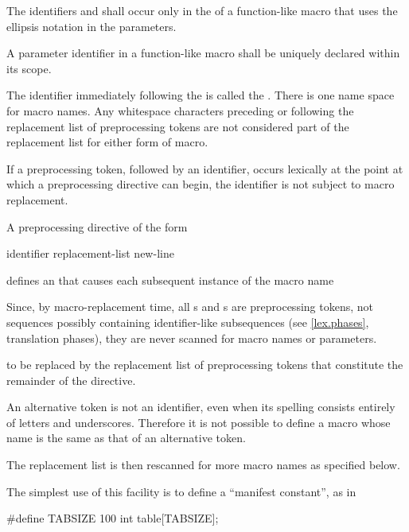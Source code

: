 \pnum
{}%
%
The identifiers  and 
shall occur only in the 
of a function-like macro that uses the ellipsis notation in the parameters.

\pnum
A parameter identifier in a function-like macro
shall be uniquely declared within its scope.

\pnum
The identifier immediately following the
is called the
%
.
There is one name space for macro names.
Any whitespace characters preceding or following the
replacement list of preprocessing tokens are not considered
part of the replacement list for either form of macro.

\pnum
If a
\tcode{\#}
preprocessing token,
followed by an identifier,
occurs lexically
at the point at which a preprocessing directive can begin,
the identifier is not subject to macro replacement.

\pnum
A preprocessing directive of the form
\begin{ncsimplebnf}
 identifier replacement-list new-line
%
\end{ncsimplebnf}
defines an
 that
causes each subsequent instance of the macro name
\begin{footnote}
Since, by macro-replacement time,
all s and s are preprocessing tokens,
not sequences possibly containing identifier-like subsequences
(see \ref{lex.phases}, translation phases),
they are never scanned for macro names or parameters.
\end{footnote}
to be replaced by the replacement list of preprocessing tokens
that constitute the remainder of the directive.
\begin{footnote}
An alternative token is not an identifier,
even when its spelling consists entirely of letters and underscores.
Therefore it is not possible to define a macro
whose name is the same as that of an alternative token.
\end{footnote}
The replacement list is then rescanned for more macro names as
specified below.

\pnum
\begin{example}
The simplest use of this facility is to define a ``manifest constant'',
as in
\begin{codeblock}
#define TABSIZE 100
int table[TABSIZE];
\end{codeblock}
\end{example}

